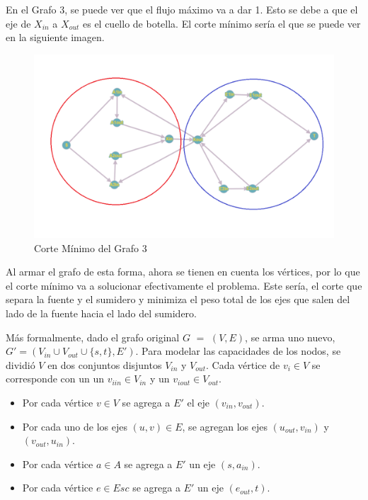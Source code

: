 En el Grafo 3, se puede ver que el flujo máximo va a dar 1. Esto se debe a que el eje de $X_{in}$ a $X_{out}$ es el cuello de botella. El corte mínimo sería el que se puede ver en la siguiente imagen.

\begin{figure}[H]
\centering
\includegraphics[width=15cm]{Imagenes/Ej1d.png}
\caption{Corte Mínimo del Grafo 3}
\end{figure}

Al armar el grafo de esta forma, ahora se tienen en cuenta los vértices, por lo que el corte mínimo va a solucionar efectivamente el problema. Este sería, el corte que separa la fuente y el sumidero y minimiza el peso total de los ejes que salen del lado de la fuente hacia el lado del sumidero.

Más formalmente, dado el grafo original $G$ $=$ $(V,E)$, se arma uno nuevo, $G' = (V_{in} \cup V_{out} \cup \{s,t\}, E')$. Para modelar las capacidades de los nodos, se dividió $V$ en dos conjuntos disjuntos $V_{in}$ y $V_{out}$. Cada vértice de $v_i \in V$ se corresponde con un un $v_{iin} \in V_{in}$ y un $v_{iout} \in V_{out}$. 

\begin{itemize}
\item Por cada vértice $v \in V$ se agrega a $E'$ el eje $(v_{in},v_{out})$.
\item Por cada uno de los ejes $(u,v) \in E$, se agregan los ejes $(u_{out}, v_{in})$ y $(v_{out}, u_{in})$.
\item Por cada vértice $a \in A$ se agrega a $E'$ un eje $(s,a_{in})$.
\item Por cada vértice $e \in Esc$ se agrega a $E'$ un eje $(e_{out},t)$.
\end{itemize}

